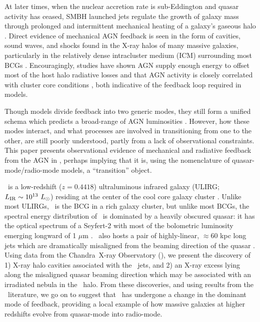 \documentclass[useAMS,usenatbib]{mn2e}
\begin{document}
At later times, when the nuclear accretion rate is sub-Eddington and
quasar activity has ceased, SMBH launched jets regulate the growth of
galaxy mass through prolonged and intermittent mechanical heating of a
galaxy's gaseous halo \citep[\eg][]{2005MNRAS.363....2K,
  2006MNRAS.368....2D}. Direct evidence of mechanical AGN feedback is
seen in the form of cavities, sound waves, and shocks found in the
X-ray halos of many massive galaxies, particularly in the relatively
dense intracluster medium (ICM) surrounding most BCGs
\citep[\eg][]{perseus1, hydraa0, 2001ApJ...554..261C,
  2007ApJ...665.1057F, 2008MNRAS.390L..93S}. Encouragingly, studies
have shown AGN supply enough energy to offset most of the host halo
radiative losses \citep[\eg][]{perseus2, birzan04, dunn06} and that
AGN activity is closely correlated with cluster core conditions
\citep[\eg][]{haradent, rafferty08}, both indicative of the feedback
loop required in models.

Though models divide feedback into two generic modes, they still form
a unified schema \citep[\eg][]{sijacki07} which predicts a broad-range
of AGN luminosities \citep[\eg][]{2009ApJ...698.1550H}. However, how
these modes interact, and what processes are involved in transitioning
from one to the other, are still poorly understood, partly from a lack
of observational constraints. This paper presents observational
evidence of mechanical and radiative feedback from the AGN in \irs,
perhaps implying that it is, using the nomenclature of
quasar-mode/radio-mode models, a ``transition'' object.

\irs\ is a low-redshift ($z = 0.4418$) ultraluminous infrared galaxy
(ULIRG; $L_{\rm{IR}} \sim 10^{13} ~L_{\odot}$) residing at the center of
the cool core galaxy cluster \object{\rxj}. Unlike most ULIRGs,
\irs\ is the BCG in a rich galaxy cluster, but unlike most BCGs, the
spectral energy distribution of \irs\ is dominated by a heavily
obscured quasar: it has the optical spectrum of a Seyfert-2 with most
of the bolometric luminosity emerging longward of 1 $\mu$m
\citep{1988ApJ...328..161K, 1993ApJ...415...82H, 1994ApJ...436L..51F,
  1998ApJ...506..205E, 2000A&A...353..910F,
  2001MNRAS.321L..15I}. \irs\ also hosts a pair of highly-linear,
$\approx 60$ kpc long jets which are dramatically misaligned from the
beaming direction of the quasar \citep[][hereafter H93 and H99,
  respectively]{1993ApJ...415...82H, 1999ApJ...512..145H}. Using data
from the Chandra\ X-ray Observatory (\cxo), we present the discovery
of 1) X-ray halo cavities associated with the \irs\ jets, and 2) an
X-ray excess lying along the misaligned quasar beaming direction which
may be associated with an irradiated nebula in the \irs\ halo. From
these discoveries, and using results from the \irs\ literature, we go
on to suggest that \irs\ has undergone a change in the dominant mode
of feedback, providing a local example of how massive galaxies at
higher redshifts evolve from quasar-mode into radio-mode.
\end{document}
